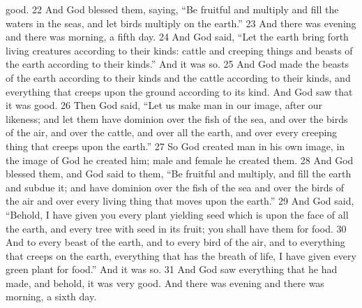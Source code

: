 good. 22 And God blessed them, saying, ``Be fruitful and multiply
and fill the waters in the seas, and let birds multiply on the
earth.'' 23 And there was evening and there was morning, a fifth
day. 24 And God said, ``Let the earth bring forth living creatures
according to their kinds: cattle and creeping things and beasts of
the earth according to their kinds.'' And it was so. 25 And God made
the beasts of the earth according to their kinds and the cattle
according to their kinds, and everything that creeps upon the
ground according to its kind. And God saw that it was good. 26 Then
God said, ``Let us make man in our image, after our likeness; and
let them have dominion over the fish of the sea, and over the birds
of the air, and over the cattle, and over all the earth, and over
every creeping thing that creeps upon the earth.'' 27 So God created
man in his own image, in the image of God he created him; male and
female he created them. 28 And God blessed them, and God said to
them, ``Be fruitful and multiply, and fill the earth and subdue it;
and have dominion over the fish of the sea and over the birds of
the air and over every living thing that moves upon the earth.'' 29
And God said, ``Behold, I have given you every plant yielding seed
which is upon the face of all the earth, and every tree with seed
in its fruit; you shall have them for food. 30 And to every beast
of the earth, and to every bird of the air, and to everything that
creeps on the earth, everything that has the breath of life, I have
given every green plant for food.'' And it was so. 31 And God saw
everything that he had made, and behold, it was very good. And
there was evening and there was morning, a sixth day. 

 



